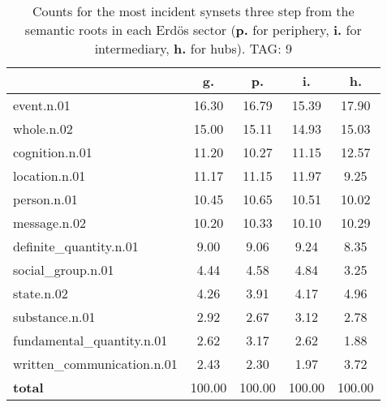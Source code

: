 \begin{table}[h!]
\begin{center}
\begin{tabular}{| l | c | c | c | c |}\hline
 & g. & p. & i. & h. \\\hline
event.n.01 & 16.30  & 16.79  & 15.39  & 17.90 \\\hline
whole.n.02 & 15.00  & 15.11  & 14.93  & 15.03 \\\hline
cognition.n.01 & 11.20  & 10.27  & 11.15  & 12.57 \\\hline
location.n.01 & 11.17  & 11.15  & 11.97  & 9.25 \\\hline
person.n.01 & 10.45  & 10.65  & 10.51  & 10.02 \\\hline
message.n.02 & 10.20  & 10.33  & 10.10  & 10.29 \\\hline
definite\_quantity.n.01 & 9.00  & 9.06  & 9.24  & 8.35 \\\hline
social\_group.n.01 & 4.44  & 4.58  & 4.84  & 3.25 \\\hline
state.n.02 & 4.26  & 3.91  & 4.17  & 4.96 \\\hline
substance.n.01 & 2.92  & 2.67  & 3.12  & 2.78 \\\hline
fundamental\_quantity.n.01 & 2.62  & 3.17  & 2.62  & 1.88 \\\hline
written\_communication.n.01 & 2.43  & 2.30  & 1.97  & 3.72 \\\hline
{{\bf total}} & 100.00  & 100.00  & 100.00  & 100.00 \\\hline
\end{tabular}
\caption{Counts for the most incident synsets three step from the semantic roots in each Erd\"os sector ({\bf p.} for periphery, {\bf i.} for intermediary, {\bf h.} for hubs). TAG: 9}
\end{center}
\end{table}